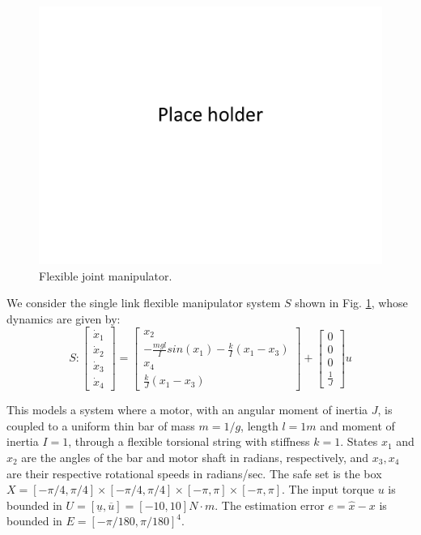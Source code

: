 \begin{figure}
	\includegraphics[scale=0.2]{figs/placeHolder.pdf}
	\caption{Flexible joint manipulator.}
	\label{fig:manipulator fig}
\end{figure}

We consider the single link flexible manipulator system $S$ shown in Fig. \ref{fig:manipulator fig}, whose dynamics are given by:
\begin{equation}
S: \begin{bmatrix} \dot{x}_1 \\ \dot{x}_2 \\ \dot{x}_3 \\ \dot{x}_4    \end{bmatrix} = \begin{bmatrix} x_2 \\ -\frac{mgl}{I}sin(x_1) - \frac{k}{I}(x_1-x_3)  \\ x_4 \\ \frac{k}{J}(x_1-x_3)  \end{bmatrix} + \begin{bmatrix} 0 \\ 0 \\ 0 \\ \frac{1}{J} \end{bmatrix}u
\end{equation}

This models a system where a motor, with an angular moment of inertia $J$,  is coupled to a uniform thin bar of mass $m=1/g$, length $l=1m$ and moment of inertia $I=1$, through a flexible torsional string with stiffness $k=1$. 
States $x_1$ and $x_2$ are the angles of the bar and motor shaft in radians, respectively, and $x_3, x_4$ are their respective rotational speeds in radians/sec.
The safe set is the box $X = [-\pi/4,\pi/4] \times [-\pi/4,\pi/4] \times [-\pi,\pi] \times [-\pi,\pi]$.
The input torque $u$ is bounded in $U = [\underline{u}, \overline{u}] = [-10 , 10 ]N\cdot m$. 
The estimation error $e = \hat{x} - x$ is bounded in $E = [-\pi /180, \pi /180]^4$.

